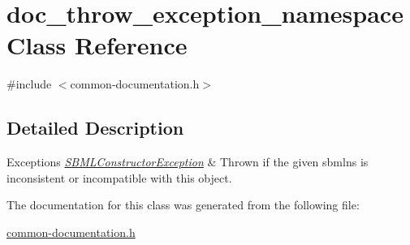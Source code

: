 \hypertarget{classdoc__throw__exception__namespace}{}\section{doc\+\_\+throw\+\_\+exception\+\_\+namespace Class Reference}
\label{classdoc__throw__exception__namespace}


{\ttfamily \#include $<$common-\/documentation.\+h$>$}



\subsection{Detailed Description}

\begin{DoxyExceptions}{Exceptions}
{\em \hyperlink{class_s_b_m_l_constructor_exception}{S\+B\+M\+L\+Constructor\+Exception}} & Thrown if the given {\ttfamily sbmlns} is inconsistent or incompatible with this object. \\
\hline
\end{DoxyExceptions}


The documentation for this class was generated from the following file\+:\begin{DoxyCompactItemize}
\item 
\hyperlink{common-documentation_8h}{common-\/documentation.\+h}\end{DoxyCompactItemize}
